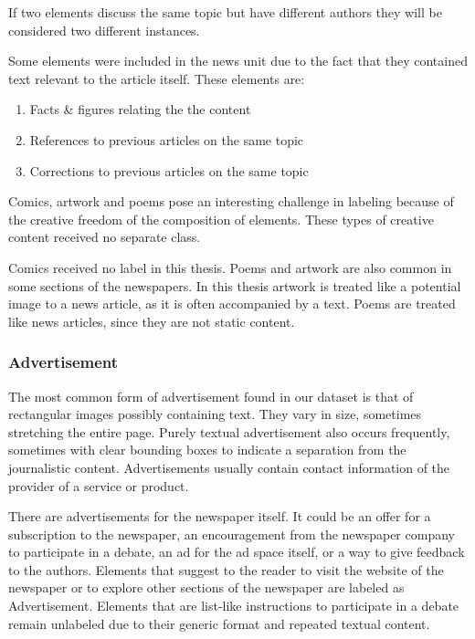 \documentclass[oneside, english, bibtex]{kththesis}
\begin{document}
If two elements discuss the same topic but have different authors they will be considered two different instances.

Some elements were included in the news unit due to the fact that they contained text relevant to the article itself. These elements are:

\begin{enumerate}
\item Facts \& figures relating the the content
\item References to previous articles on the same topic
\item Corrections to previous articles on the same topic
\end{enumerate}

Comics, artwork and poems pose an interesting challenge in labeling because of the creative freedom of the composition of elements. These types of creative content received no separate class. 

Comics received no label in this thesis. Poems and artwork are also common in some sections of the newspapers. In this thesis artwork is treated like a potential image to a news article, as it is often accompanied by a text. Poems are treated like news articles, since they are not static content.

\subsubsection{Advertisement}
\label{subsub:labelads}

The most common form of advertisement found in our dataset is that of rectangular images possibly containing text.
They vary in size, sometimes stretching the entire page.
Purely textual advertisement also occurs frequently, sometimes with clear bounding boxes to indicate a separation from the journalistic content.
Advertisements usually contain contact information of the provider of a service or product.

There are advertisements for the newspaper itself.
It could be an offer for a subscription to the newspaper,
an encouragement from the newspaper company to participate in a debate, an ad for the ad space itself,
or a way to give feedback to the authors. Elements that suggest to the reader to visit the website of the newspaper
or to explore other sections of the newspaper are labeled as Advertisement.
Elements that are list-like instructions to participate in a debate remain unlabeled due to their generic format and repeated textual content.
\end{document}
